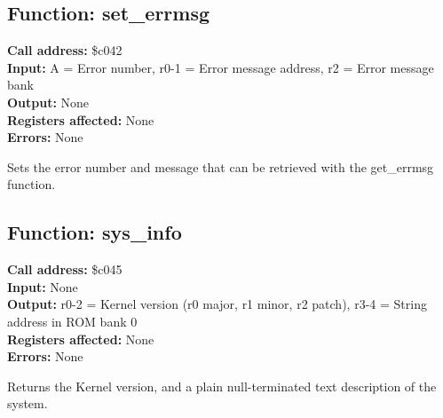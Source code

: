 \subsection{Function: set\_errmsg}

\textbf{Call address:} \$c042\\
\textbf{Input:} A = Error number, r0-1 = Error message address, r2 = Error message bank \\
\textbf{Output:} None \\
\textbf{Registers affected:} None \\
\textbf{Errors:} None

Sets the error number and message that can be retrieved with the
get\_errmsg function.


\subsection{Function: sys\_info}

\textbf{Call address:} \$c045\\
\textbf{Input:} None \\
\textbf{Output:} r0-2 = Kernel version (r0 major, r1 minor, r2 patch), r3-4 = String address in ROM bank 0 \\
\textbf{Registers affected:}  None \\
\textbf{Errors:} None

Returns the Kernel version, and a plain null-terminated text description of the system.
